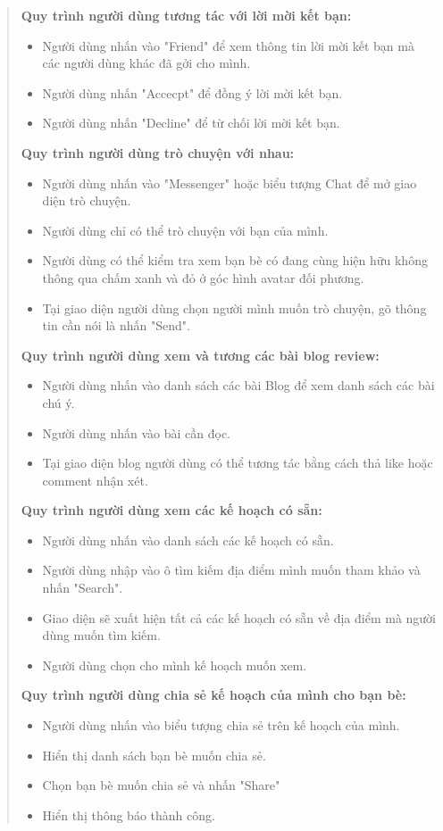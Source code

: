 \begin{quote}
\begin{itemize}
     \end{itemize}
     \textbf{Quy trình người dùng tương tác với lời mời kết bạn:  }
     \begin{itemize}
         \item Người dùng nhấn vào "Friend" để xem thông tin lời mời kết bạn mà các người dùng khác đã gởi cho mình.
        \item Người dùng nhấn "Accecpt" để đồng ý lời mời kết bạn.
        \item Người dùng nhấn "Decline" để từ chối lời mời kết bạn.
     \end{itemize}
     \textbf{Quy trình người dùng trò chuyện với nhau: }
     \begin{itemize}
         \item Người dùng nhấn vào "Messenger" hoặc biểu tượng Chat để mở giao diện trò chuyện.
         \item Người dùng chỉ có thể trò chuyện với bạn của mình.
         \item Người dùng có thể kiểm tra xem bạn bè có đang cùng hiện hữu không thông qua chấm xanh và đỏ ở góc hình avatar đối phương.
         \item Tại giao diện người dùng chọn người mình muốn trò chuyện, gõ thông tin cần nói là nhấn "Send". 
     \end{itemize}
     \textbf{Quy trình người dùng xem và tương các bài blog review: }
    \begin{itemize}
        \item Người dùng nhấn vào danh sách các bài Blog để xem danh sách các bài chú ý.
        \item Người dùng nhấn vào bài cần đọc.
        \item Tại giao diện blog người dùng có thể tương tác bằng cách thả like hoặc comment nhận xét.
    \end{itemize}
    \textbf{Quy trình người dùng xem các kế hoạch có sẵn: }
    \begin{itemize}
        \item Người dùng nhấn vào danh sách các kế hoạch có sẵn.
        \item Người dùng nhập vào ô tìm kiếm địa điểm mình muốn tham khảo và nhấn "Search".
        \item Giao diện sẽ xuất hiện tất cả các kế hoạch có sẵn về địa điểm mà người dùng muốn tìm kiếm.
        \item Người dùng chọn cho mình kế hoạch muốn xem.
    \end{itemize}
    
    \textbf{Quy trình người dùng chia sẻ kế hoạch của mình cho bạn bè: }
    \begin{itemize}
        \item Người dùng nhấn vào biểu tượng chia sẻ trên kế hoạch của mình.
        \item Hiển thị danh sách bạn bè muốn chia sẻ.
        \item Chọn bạn bè muốn chia sẻ và nhấn "Share"
        \item Hiển thị thông báo thành công.
    \end{itemize}
\end{quote}

